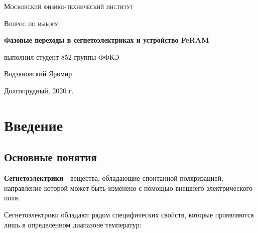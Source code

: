 \documentclass[a4paper]{article}
\begin{document}
\begin{titlepage}
	\centering
	\vspace{5cm}
	{\scshape\LARGE Московский физико-технический институт \par}
	\vspace{4cm}
	{\scshape\Large Вопрос по выбору \par}
	\vspace{1cm}
	{\huge\bfseries  Фазовые переходы в сегнетоэлектриках и устройство FeRAM \par}
	\vspace{1cm}
	\vfill
\begin{flushright}
	{\large выполнил студент 852 группы ФФКЭ}\par
	\vspace{0.3cm}
	{\LARGE Водзяновский Яромир}
\end{flushright}
	
	\vfill

	Долгопрудный, 2020 г.
\end{titlepage}

\newpage

\tableofcontents

\newpage

\section{Введение} 

\subsection{Основные понятия}

\textbf{Сегнетоэлектрики} -  вещества, обладающие спонтанной поляризацией, направление которой может быть изменено с помощью внешнего электрического поля. 

Сегнетоэлектрики обладают рядом специфических свойств, которые проявляются лишь в определенном диапазоне температур:
\end{document}
